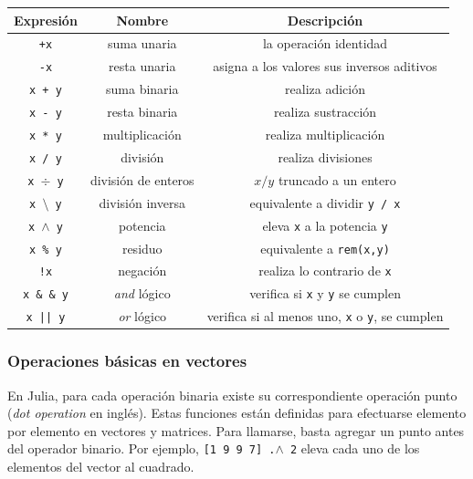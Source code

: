 \begin{center}
	\begin{tabular}{|c|c|c|} 
		\hline
		Expresión & Nombre & Descripción \\ 
		\hline 
		\texttt{+x} & suma unaria & la operación identidad \\ 

		\texttt{-x} & resta unaria & asigna a los valores sus inversos aditivos \\ 

		\texttt{x + y} & suma binaria & realiza adición \\ 

		\texttt{x - y} & resta binaria & realiza sustracción \\

		\texttt{x * y} & multiplicación & realiza multiplicación \\

		\texttt{x / y} & división & realiza divisiones \\

		\texttt{x $\div$ y} & división de enteros & $x / y$ truncado a un entero \\

		\texttt{x $\setminus$ y} & división inversa & equivalente a dividir \texttt{y / x} \\

		\texttt{x $\wedge$ y} & potencia & eleva \texttt{x} a la potencia \texttt{y} \\

		\texttt{x \% y} & residuo & equivalente a \texttt{rem(x,y)} \\
		
		\texttt{!x} & negación & realiza lo contrario de \texttt{x} \\
		
		\texttt{x \& \& y} & \textit{and} lógico & verifica si \texttt{x} y \texttt{y} se cumplen \\
		
		\texttt{x || y} & \textit{or} lógico & verifica si al menos uno, \texttt{x} o \texttt{y},  se cumplen \\
		\hline
	\end{tabular} 
	 \label{operaciones_basicas_Julia}
\end{center}


\subsubsection{Operaciones básicas en vectores}
En Julia, para cada operación binaria existe su correspondiente operación punto (\textit{dot operation} en inglés). Estas funciones están definidas para efectuarse elemento por elemento en vectores y matrices. Para llamarse, basta agregar un punto antes del operador binario. Por ejemplo,
 \texttt{[1 9 9 7] .$\wedge$ 2} eleva cada uno de los elementos del vector al cuadrado. 

